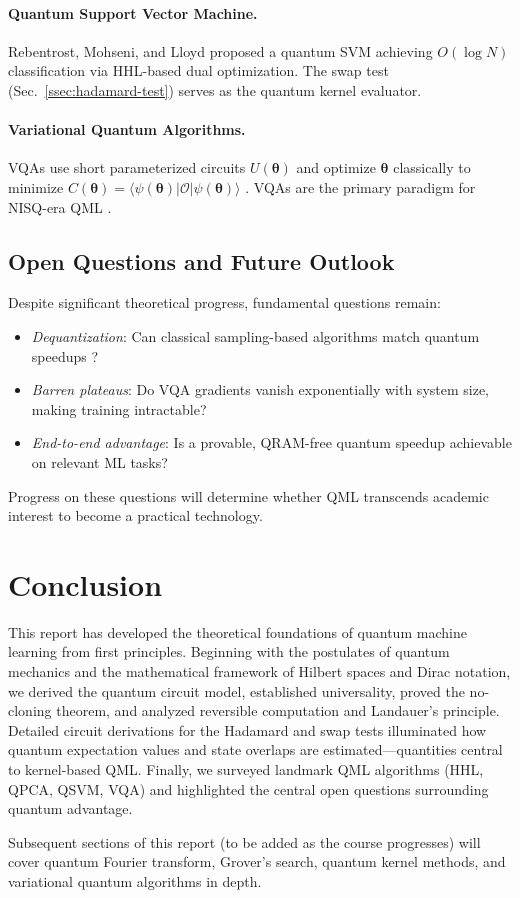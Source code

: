 \documentclass[aps, reprint, twocolumn, superscriptaddress, floatfix]{revtex4-2}
\begin{document}
\paragraph{Quantum Support Vector Machine.}
Rebentrost, Mohseni, and Lloyd \cite{rebentrost2014quantum} proposed a quantum
SVM achieving $O(\log N)$ classification via HHL-based dual optimization.
The swap test (Sec.~\ref{ssec:hadamard-test}) serves as the quantum kernel evaluator.

\paragraph{Variational Quantum Algorithms.}
VQAs use short parameterized circuits $U(\boldsymbol{\theta})$ and optimize
$\boldsymbol{\theta}$ classically to minimize
$C(\boldsymbol{\theta}) = \langle\psi(\boldsymbol{\theta})|
\mathcal{O}|\psi(\boldsymbol{\theta})\rangle$ \cite{cerezo2021variational}.
VQAs are the primary paradigm for NISQ-era QML \cite{preskill2018quantum}.

\subsection{Open Questions and Future Outlook}
\label{ssec:outlook}

Despite significant theoretical progress, fundamental questions remain:
\begin{itemize}
  \item \textit{Dequantization}: Can classical sampling-based algorithms
    match quantum speedups \cite{schuld2021machine}?
  \item \textit{Barren plateaus}: Do VQA gradients vanish exponentially
    with system size, making training intractable?
  \item \textit{End-to-end advantage}: Is a provable, QRAM-free quantum speedup
    achievable on relevant ML tasks?
\end{itemize}
Progress on these questions will determine whether QML transcends academic
interest to become a practical technology.

\section{Conclusion}
\label{sec:conclusion}

This report has developed the theoretical foundations of quantum machine learning
from first principles.  Beginning with the postulates of quantum mechanics and the
mathematical framework of Hilbert spaces and Dirac notation, we derived the
quantum circuit model, established universality, proved the no-cloning theorem,
and analyzed reversible computation and Landauer's principle.  Detailed circuit
derivations for the Hadamard and swap tests illuminated how quantum expectation
values and state overlaps are estimated---quantities central to kernel-based QML.
Finally, we surveyed landmark QML algorithms (HHL, QPCA, QSVM, VQA) and
highlighted the central open questions surrounding quantum advantage.

Subsequent sections of this report (to be added as the course progresses) will
cover quantum Fourier transform, Grover's search, quantum kernel methods, and
variational quantum algorithms in depth.


\end{document}
